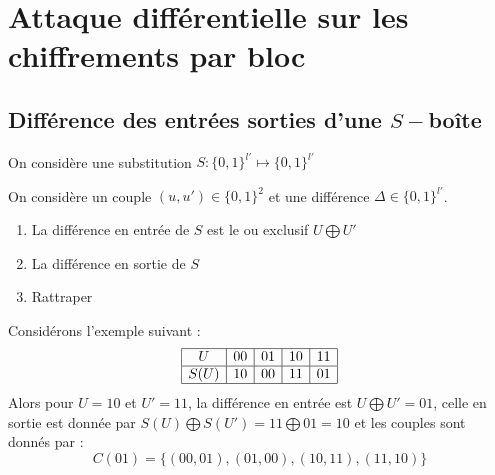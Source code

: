 \documentclass[a4paper, 10pt]{thesis}
\begin{document}
\chapter{Attaque diff\'erentielle sur les chiffrements par bloc}

\section{Différence des entrées sorties d'une $S-$boîte}

On considère une substitution $S : \{0,1\}^{l'} \longmapsto \{0,1\}^{l'}$

\begin{df}
    On considère un couple $(u, u') \in \{0, 1\}^2$ et une différence $\Delta \in \{0,1\}^{l'}$.
    \begin{enumerate}
        \item La différence en entrée de $S$ est le ou exclusif $U \bigoplus U'$
        \item La différence en sortie de $S$
        \item Rattraper
    \end{enumerate}
\end{df}

\begin{ex}
    Considérons l'exemple suivant :
    \begin{displaymath}
        \begin{array}{|c|c|c|c|c|}
            \hline
            U & 00 & 01 & 10 & 11 \\ \hline
            S(U) & 10 & 00 & 11 & 01 \\ \hline
        \end{array}
    \end{displaymath}
    Alors pour $U = 10$ et $U' = 11$, la différence en entrée est $U \bigoplus U' = 01$, celle en
    sortie est donnée par $S(U) \bigoplus S(U') = 11 \bigoplus 01 = 10$ et les couples sont donnés
    par : \begin{displaymath}
        C(01) =\{(00, 01), (01, 00) , (10, 11), (11, 10)\}
    \end{displaymath}
\end{ex}
\end{document}

